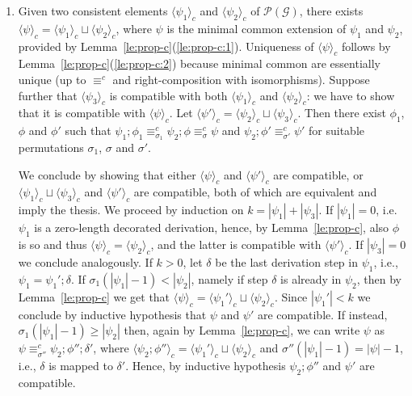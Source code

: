 \documentclass[conference]{IEEEtran}
\renewenvironment{proof}{\begin{IEEEproof}}{\end{IEEEproof}}
\newcommand{\poset}[1]{\ensuremath{\mathcal{P}({#1})}}
\newcommand{\interval}[2][1]{\ensuremath{[{#1},{#2}]}}
\newcommand{\perm}{\sigma}
\newcommand{\ltrace}[1]{\ensuremath{\langle {#1}\rangle_c}}
\begin{document}
\begin{proof}
\begin{enumerate}
    
  \item Given two consistent elements $\ltrace{\psi_1}$ and
    $\ltrace{\psi_2}$ of $\poset{\mathcal{G}}$, there exists
    $\ltrace{\psi} = \ltrace{\psi_1} \sqcup \ltrace{\psi_2}$, where
    $\psi$ is the minimal common extension of $\psi_1$ and $\psi_2$,
    provided by Lemma~\ref{le:prop-c}(\ref{le:prop-c:1}). Uniqueness
    of $\ltrace{\psi}$ follows by
    Lemma~\ref{le:prop-c}(\ref{le:prop-c:2})
    because minimal common are essentially unique (up to $\equiv^c$
    and right-composition with isomorphisms).  Suppose further that
    $\ltrace{\psi_3}$ is compatible with both $\ltrace{\psi_1}$ and
    $\ltrace{\psi_2}$: we have to show that it is compatible with
    $\ltrace{\psi}$.  Let
    $\ltrace{\psi'} = \ltrace{\psi_2} \sqcup \ltrace{\psi_3}$. Then
    there exist $\phi_1$, $\phi$ and $\phi'$ such that
    $\psi_1 ; \phi_1 \equiv^c_{\perm_1} \psi_2 ; \phi \equiv^c_{\perm}
    \psi$ and $\psi_2 ; \phi' \equiv^c_{\perm'} \psi'$ for suitable
    permutations $\perm_1$, $\perm$ and $\perm'$.
    
    We conclude by showing that either $\ltrace{\psi}$ and $\ltrace{\psi'}$ 
    are compatible, or $\ltrace{\psi_1} \sqcup  \ltrace{\psi_3}$ and $\ltrace{\psi'}$
    are compatible, both of which are equivalent and imply the thesis. We proceed by 
    induction on $k = |\psi_1|+|\psi_3|$.  If
    $|\psi_1|=0$, i.e.~$\psi_1$ is a zero-length decorated derivation, hence,
    by Lemma~\ref{le:prop-c}, also $\phi$ is so and thus
    $\ltrace{\psi} = \ltrace{\psi_2}$, and the latter is compatible
    with $\ltrace{\psi'}$. If $|\psi_3|=0$ we conclude analogously.  
    If $k>0$, let $\delta$ be the last
     derivation step in $\psi_1$, i.e.,
    $\psi_1 = \psi_1'; \delta$. If $\sigma_1(|\psi_1|-1) < |\psi_2|$,
    namely if step $\delta$ is already in $\psi_2$, then by
    Lemma~\ref{le:prop-c} we get that
    $\ltrace{\psi} = \ltrace{\psi_1'} \sqcup \ltrace{\psi_2}$. Since
    $|\psi_1'| < k$ we conclude by inductive hypothesis
    that $\psi$ and $\psi'$ are compatible. If instead,
    $\sigma_1(|\psi_1|-1) \geq |\psi_2|$ then, again by Lemma~\ref{le:prop-c},
    we can write $\psi$ as
    $\psi \equiv^c_{\sigma''} \psi_2; \phi''; \delta'$, where
    $\ltrace{\psi_2; \phi''} = \ltrace{\psi_1'} \sqcup
    \ltrace{\psi_2}$ and $\sigma''(|\psi_1|-1) = |\psi|-1$, i.e., $\delta$
    is mapped to $\delta'$. Hence, by inductive hypothesis
    $\psi_2; \phi''$ and $\psi'$ are compatible.
    

\end{enumerate}
\end{proof}
\end{document}
